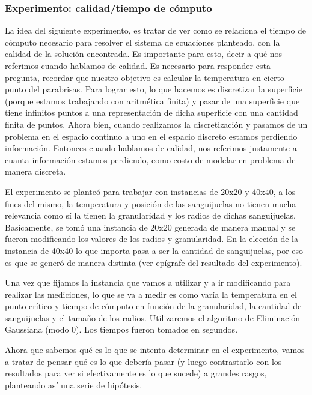\subsubsection{Experimento: calidad/tiempo de cómputo}
La idea del siguiente experimento, es tratar de ver como se relaciona el tiempo de cómputo necesario para resolver el sistema de ecuaciones planteado, con la calidad de la solución encontrada. Es importante para esto, decir a qué nos referimos cuando hablamos de calidad. Es necesario para responder esta pregunta, recordar que nuestro objetivo es calcular la temperatura en cierto punto del parabrisas. Para lograr esto, lo que hacemos es discretizar la superficie (porque estamos trabajando con aritmética finita) y pasar de una superficie que tiene infinitos puntos a una representación de dicha superficie con una cantidad finita de puntos. Ahora bien, cuando realizamos la discretización y pasamos de un problema en el espacio continuo a uno en el espacio discreto estamos perdiendo información. Entonces cuando hablamos de calidad, nos referimos justamente a cuanta información estamos perdiendo, como costo de modelar en problema de manera discreta.
\par El experimento se planteó para trabajar con instancias de 20x20 y 40x40, a los fines del mismo, la temperatura y posición de las sanguijuelas no tienen mucha relevancia como sí la tienen la granularidad y los radios de dichas sanguijuelas. Basícamente, se tomó una instancia de 20x20 generada de manera manual y se fueron modificando los valores de los radios y granularidad. En la elección de la instancia de 40x40 lo que importa pasa a ser la cantidad de sanguijuelas, por eso es que se generó de manera distinta (ver epígrafe del resultado del experimento).
\par Una vez que fijamos la instancia que vamos a utilizar y a ir modificando para realizar las mediciones, lo que se va a medir es como varía la temperatura en el punto crítico y tiempo de cómputo en función de la granularidad, la cantidad de sanguijuelas y el tamaño de los radios. Utilizaremos el algoritmo de Eliminación Gaussiana (modo 0). Los tiempos fueron tomados en segundos.
\newline \par Ahora que sabemos qué es lo que se intenta determinar en el experimento, vamos a tratar de pensar qué es lo que debería pasar (y luego contrastarlo con los resultados para ver si efectivamente es lo que sucede) a grandes rasgos, planteando así una serie de hipótesis. 
